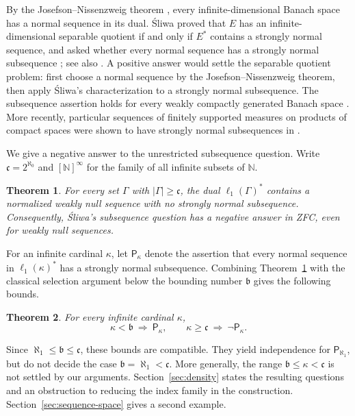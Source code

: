 \documentclass[10pt,a4paper]{amsart}
\newtheorem{maintheorem}{Theorem}
\newcommand{\N}{\mathbb N}
\newcommand{\cfrak}{\mathfrak c}
\begin{document}
By the Josefson--Nissenzweig theorem \cite{Josefson,Nissenzweig}, every
infinite-dimensional Banach space has a normal sequence in its dual.
\'Sliwa \cite[Theorem~3]{Sliwa} proved that $E$ has an
infinite-dimensional separable quotient if and only if $E^*$ contains
a strongly normal sequence, and asked whether every normal sequence
has a strongly normal subsequence \cite[p.~388]{Sliwa}; see also
\cite[Problem~7]{FKLS}. A positive answer would settle the separable
quotient problem: first choose a normal sequence by the
Josefson--Nissenzweig theorem, then apply \'Sliwa's characterization to
a strongly normal subsequence. The subsequence assertion holds for
every weakly compactly generated Banach space
\cite[Proposition~4]{Sliwa}. More recently, particular sequences of
finitely supported measures on products of compact spaces were shown
to have strongly normal subsequences in \cite[Theorem~2(5)]{KLS}.

We give a negative answer to the unrestricted subsequence question.
Write $\cfrak=2^{\aleph_0}$ and $[\N]^\infty$ for the family of all
infinite subsets of $\N$.

\begin{maintheorem}\label{thm:large}
For every set $\Gamma$ with $|\Gamma|\geqslant\cfrak$, the dual
$\ell_1(\Gamma)^*$ contains a normalized weakly null sequence with no
strongly normal subsequence. Consequently, \'Sliwa's subsequence
question has a negative answer in ZFC, even for weakly null sequences.
\end{maintheorem}

For an infinite cardinal $\kappa$, let $\mathsf P_\kappa$ denote the
assertion that every normal sequence in $\ell_1(\kappa)^*$ has a
strongly normal subsequence. Combining Theorem~\ref{thm:large} with
the classical selection argument below the bounding number
$\mathfrak b$ gives the following bounds.


\begin{maintheorem}\label{thm:bounds}
For every infinite cardinal $\kappa$,
\[
 \kappa<\mathfrak b\ \Longrightarrow\ \mathsf P_\kappa,
 \qquad
 \kappa\geqslant\cfrak\ \Longrightarrow\ \neg\mathsf P_\kappa.
\]
\end{maintheorem}


Since $\aleph_1\leqslant\mathfrak b\leqslant\cfrak$, these bounds
are compatible. They yield independence for $\mathsf P_{\aleph_1}$,
but do not decide the case $\mathfrak b=\aleph_1<\cfrak$. More
generally, the range $\mathfrak b\leqslant\kappa<\cfrak$ is not
settled by our arguments. Section~\ref{sec:density} states the resulting
questions and an obstruction to reducing the index family in the
construction. Section~\ref{sec:sequence-space} gives a second example.
\end{document}

